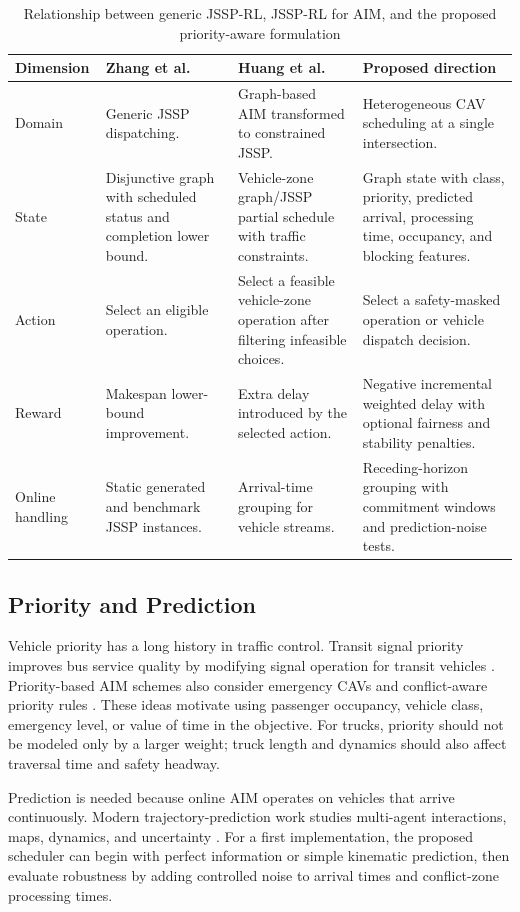 \begin{table}[t]
\centering
\caption{Relationship between generic JSSP-RL, JSSP-RL for AIM, and the proposed priority-aware formulation}
\label{tab:zhang-huang-proposed}
\scriptsize
\setlength{\tabcolsep}{3pt}
\begin{tabular}{p{}p{}p{}p{}}
\toprule
Dimension & Zhang et al. \cite{zhang2020learning} & Huang et al. \cite{huang2023reinforcement} & Proposed direction \\
\midrule
Domain & Generic JSSP dispatching. & Graph-based AIM transformed to constrained JSSP. & Heterogeneous CAV scheduling at a single intersection. \\
State & Disjunctive graph with scheduled status and completion lower bound. & Vehicle-zone graph/JSSP partial schedule with traffic constraints. & Graph state with class, priority, predicted arrival, processing time, occupancy, and blocking features. \\
Action & Select an eligible operation. & Select a feasible vehicle-zone operation after filtering infeasible choices. & Select a safety-masked operation or vehicle dispatch decision. \\
Reward & Makespan lower-bound improvement. & Extra delay introduced by the selected action. & Negative incremental weighted delay with optional fairness and stability penalties. \\
Online handling & Static generated and benchmark JSSP instances. & Arrival-time grouping for vehicle streams. & Receding-horizon grouping with commitment windows and prediction-noise tests. \\
\bottomrule
\end{tabular}
\end{table}

\subsection{Priority and Prediction}

Vehicle priority has a long history in traffic control. Transit signal priority improves bus service quality by modifying signal operation for transit vehicles \cite{lin2015transit}. Priority-based AIM schemes also consider emergency CAVs and conflict-aware priority rules \cite{zhang2021priorityaim}. These ideas motivate using passenger occupancy, vehicle class, emergency level, or value of time in the objective. For trucks, priority should not be modeled only by a larger weight; truck length and dynamics should also affect traversal time and safety headway.

Prediction is needed because online AIM operates on vehicles that arrive continuously. Modern trajectory-prediction work studies multi-agent interactions, maps, dynamics, and uncertainty \cite{salzmann2020trajectron,teeti2022vision}. For a first implementation, the proposed scheduler can begin with perfect information or simple kinematic prediction, then evaluate robustness by adding controlled noise to arrival times and conflict-zone processing times.
